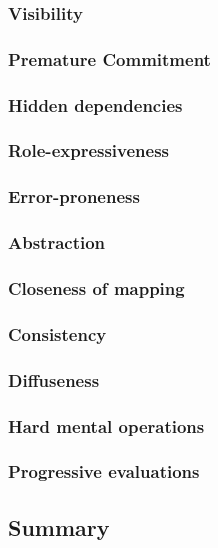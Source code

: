 \subsubsection[*]{Visibility}

\subsubsection[*]{Premature Commitment}

\subsubsection[*]{Hidden dependencies}

\subsubsection[*]{Role-expressiveness}

\subsubsection[*]{Error-proneness}

\subsubsection[*]{Abstraction}

\subsubsection[*]{Closeness of mapping}

\subsubsection[*]{Consistency}

\subsubsection[*]{Diffuseness}

\subsubsection[*]{Hard mental operations}

\subsubsection[*]{Progressive evaluations}

\subsection{Summary}
